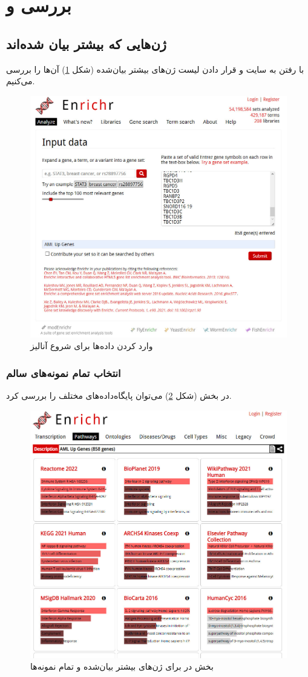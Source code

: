 \documentclass{article}
\begin{document}
\section{بررسی  و }
\subsection{ژن‌هایی که بیشتر بیان شده‌اند}
با رفتن به سایت \href{https://maayanlab.cloud/Enrichr/}{} و قرار دادن لیست ژن‌های بیشتر بیان‌شده (شکل \ref{fig:enrichr}) آن‌‌ها را بررسی می‌کنیم.
\begin{figure}[h!]
	\centering
	\includegraphics[width=0.5\columnwidth]{figs/enrichr.jpg}
	\caption{وارد کردن داده‌ها برای شروع آنالیز}
	\label{fig:enrichr}
\end{figure}

\subsubsection{انتخاب تمام نمونه‌های سالم}
در بخش  (شکل \ref{fig:enrichr-pathways}) می‌توان پایگاه‌داده‌های  مختلف را بررسی کرد.
\begin{figure}[h!]
	\centering
	\includegraphics[width=0.5\columnwidth]{figs/enrichr-pathways.jpg}
	\caption{بخش  در  برای ژن‌های بیشتر بیان‌شده و تمام نمونه‌ها}
	\label{fig:enrichr-pathways}
\end{figure}
\end{document}
